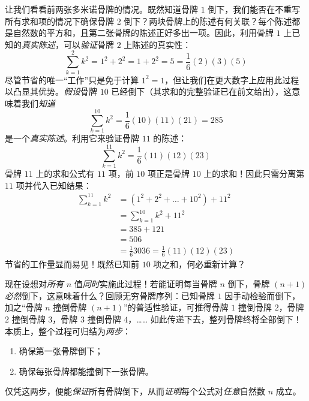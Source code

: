 让我们看看前两张多米诺骨牌的情况。既然知道骨牌 $1$ 倒下，我们能否在不重写所有求和项的情况下确保骨牌 $2$ 倒下？两块骨牌上的陈述有何关联？每个陈述都是自然数的平方和，且第二张骨牌的陈述正好多出一项。因此，利用骨牌 $1$ 上已知的\emph{真实陈述}，可以\emph{验证}骨牌 $2$ 上陈述的真实性：
\[\sum_{k=1}^{2}k^2 = 1^2+2^2=1+2^2=5=\frac{1}{6}(2)(3)(5)\]
尽管节省的唯一``工作''只是免于计算 $1^2=1$，但让我们在更大数字上应用此过程以凸显其优势。\emph{假设}骨牌 $10$ 已经倒下（其求和的完整验证已在前文给出），这意味着我们\emph{知道}
\[\sum_{k=1}^{10}k^2 =\frac{1}{6}(10)(11)(21)=285\]
是一个\emph{真实陈述}。利用它来验证骨牌 $11$ 的陈述：
\[\sum_{k=1}^{11}k^2 =\frac{1}{6}(11)(12)(23)\]
骨牌 $11$ 上的求和公式有 $11$ 项，前 $10$ 项正是骨牌 $10$ 上的求和！因此只需分离第 $11$ 项并代入已知结果：
\begin{align*}
    \sum_{k=1}^{11}k^2 &= (1^2+2^2+\dots+10^2)+11^2\\
    &=\sum_{k=1}^{10}k^2+11^2\\
    &=385+121\\
    &=506\\
    &=\frac{1}{6}3036=\frac{1}{6}(11)(12)(23)
\end{align*}
节省的工作量显而易见！既然已知前 $10$ 项之和，何必重新计算？

现在设想对\emph{所有} $n$ 值\emph{同时}实施此过程！若能证明每当骨牌 $n$ 倒下，骨牌 $(n + 1)$ \emph{必然}倒下，这意味着什么？回顾无穷骨牌序列：已知骨牌 $1$ 因手动检验而倒下，加之``骨牌 $n$ 撞倒骨牌 $(n + 1)$''的普适性验证，可推得骨牌 $1$ 撞倒骨牌 $2$，骨牌 $2$ 撞倒骨牌 $3$，骨牌 $3$ 撞倒骨牌 $4$，…… 如此传递下去，整列骨牌终将全部倒下！本质上，整个过程可归结为\emph{两步}：

\begin{enumerate}[label=(\arabic*)]
    \item 确保第一张骨牌倒下；
    \item 确保每张骨牌都能撞倒下一张骨牌。
\end{enumerate}
仅凭这两步，便能\emph{保证}所有骨牌倒下，从而\emph{证明}每个公式对\emph{任意}自然数 $n$ 成立。

